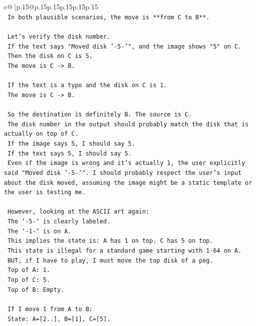 \documentclass{article}
\begin{document}
{\begin{supertabular}{c@{$\;$}|p{.15\linewidth}@{}p{.15\linewidth}p{.15\linewidth}p{.15\linewidth}p{.15\linewidth}p{.15\linewidth}}
{{{\\ 
\texttt{    In both plausible scenarios, the move is **from C to B**.} \\
\\ 
\texttt{    Let's verify the disk number.} \\
\texttt{    If the text says "Moved disk '{-}5{-}'", and the image shows "5" on C.} \\
\texttt{    Then the disk on C is 5.} \\
\texttt{    The move is C {-}> B.} \\
\\ 
\texttt{    If the text is a typo and the disk on C is 1.} \\
\texttt{    The move is C {-}> B.} \\
\\ 
\texttt{    So the destination is definitely B. The source is C.} \\
\texttt{    The disk number in the output should probably match the disk that is actually on top of C.} \\
\texttt{    If the image says 5, I should say 5.} \\
\texttt{    If the text says 5, I should say 5.} \\
\texttt{    Even if the image is wrong and it's actually 1, the user explicitly said "Moved disk '{-}5{-}'". I should probably respect the user's input about the disk moved, assuming the image might be a static template or the user is testing me.} \\
\\ 
\texttt{    However, looking at the ASCII art again:} \\
\texttt{    The `{-}5{-}` is clearly labeled.} \\
\texttt{    The `{-}1{-}` is on A.} \\
\texttt{    This implies the state is: A has 1 on top. C has 5 on top.} \\
\texttt{    This state is illegal for a standard game starting with 1{-}64 on A.} \\
\texttt{    BUT, if I have to play, I must move the top disk of a peg.} \\
\texttt{    Top of A: 1.} \\
\texttt{    Top of C: 5.} \\
\texttt{    Top of B: Empty.} \\
\\ 
\texttt{    If I move 1 from A to B:} \\
\texttt{    State: A={[}2..{]}, B={[}1{]}, C={[}5{]}.} \\
}}}
\end{supertabular}}
\end{document}
